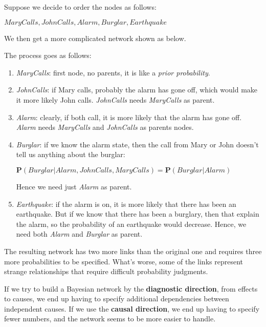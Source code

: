 \begin{example}
    Suppose we decide to
    order the nodes as follows:
    \begin{center}
        $MaryCalls, JohnCalls, Alarm, Burglar, Earthquake$
    \end{center}
    We then get a more complicated network shown as below.
    \begin{center}
    \end{center}
    The process goes as follows:
    \begin{enumerate}
        \item \textit{MaryCalls}: first node, no parents, it is like a \textit{prior probability}.
        \item \textit{JohnCalls}: if Mary calls, probably the alarm has gone off, which would make it more likely John calls. \textit{JohnCalls} needs \textit{MaryCalls} as parent.
        \item \textit{Alarm}: clearly, if both call, it is more likely that the alarm has gone off. \textit{Alarm} needs \textit{MaryCalls} and \textit{JohnCalls} as parents nodes.
        \item \textit{Burglar}: if we know the alarm state, then the call from Mary or John doesn't tell us anything about the burglar: 
        \begin{center}
            $\mathbf{P}(Burglar|Alarm, JohnCalls, MaryCalls) = \mathbf{P}(Burglar|Alarm)$    
        \end{center}
        Hence we need just \textit{Alarm} as parent.
        \item \textit{Earthquake}: if the alarm is on, it is more likely that there has been an earthquake. But if we know that there has been a burglary, then that explain the alarm, so the probability of an earthquake would decrease. Hence, we need both \textit{Alarm} and \textit{Burglar} as parent.
    \end{enumerate} \vspace{3.5pt}

    The resulting network has two more links than the original one and requires three more probabilities to be specified. What's worse, some of the links represent strange relationships
    that require difficult probability judgments. 
\end{example}
If we try to build a Bayesian network by the \textbf{diagnostic direction}, from effects to causes, we end up having to specify additional dependencies between independent causes. If we use the \textbf{causal direction}, we end up having to 
specify fewer numbers, and the network seems to be more easier to handle. 